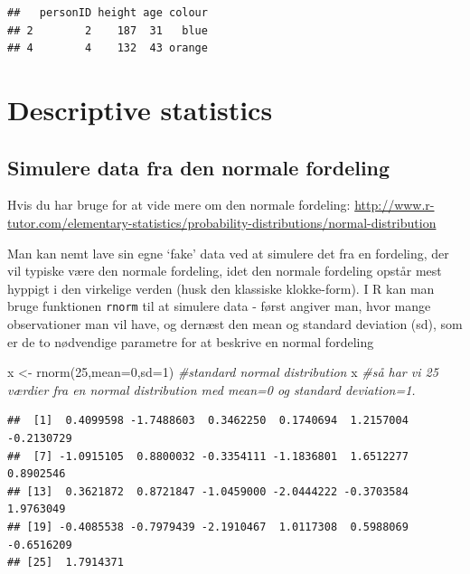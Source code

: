 \documentclass[
]{book}
\newenvironment{Shaded}{\begin{snugshade}}{\end{snugshade}}
\newcommand{\AttributeTok}[1]{\textcolor[rgb]{0.77,0.63,0.00}{#1}}
\newcommand{\CommentTok}[1]{\textcolor[rgb]{0.56,0.35,0.01}{\textit{#1}}}
\newcommand{\DecValTok}[1]{\textcolor[rgb]{0.00,0.00,0.81}{#1}}
\newcommand{\FunctionTok}[1]{\textcolor[rgb]{0.00,0.00,0.00}{#1}}
\newcommand{\NormalTok}[1]{#1}
\newcommand{\OtherTok}[1]{\textcolor[rgb]{0.56,0.35,0.01}{#1}}
\begin{document}
\begin{verbatim}
##   personID height age colour
## 2        2    187  31   blue
## 4        4    132  43 orange
\end{verbatim}

\hypertarget{descriptive-statistics}{%
\section{Descriptive statistics}\label{descriptive-statistics}}

\hypertarget{simulere-data-fra-den-normale-fordeling}{%
\subsection{Simulere data fra den normale fordeling}\label{simulere-data-fra-den-normale-fordeling}}

Hvis du har bruge for at vide mere om den normale fordeling: \url{http://www.r-tutor.com/elementary-statistics/probability-distributions/normal-distribution}

Man kan nemt lave sin egne `fake' data ved at simulere det fra en fordeling, der vil typiske være den normale fordeling, idet den normale fordeling opstår mest hyppigt i den virkelige verden (husk den klassiske klokke-form). I R kan man bruge funktionen \texttt{rnorm} til at simulere data - først angiver man, hvor mange observationer man vil have, og dernæst den mean og standard deviation (sd), som er de to nødvendige parametre for at beskrive en normal fordeling

\begin{Shaded}
\begin{Highlighting}[]
\NormalTok{x }\OtherTok{\textless{}{-}} \FunctionTok{rnorm}\NormalTok{(}\DecValTok{25}\NormalTok{,}\AttributeTok{mean=}\DecValTok{0}\NormalTok{,}\AttributeTok{sd=}\DecValTok{1}\NormalTok{) }\CommentTok{\#standard normal distribution}
\NormalTok{x }\CommentTok{\#så har vi 25 værdier fra en normal distribution med mean=0 og standard deviation=1.}
\end{Highlighting}
\end{Shaded}

\begin{verbatim}
##  [1]  0.4099598 -1.7488603  0.3462250  0.1740694  1.2157004 -0.2130729
##  [7] -1.0915105  0.8800032 -0.3354111 -1.1836801  1.6512277  0.8902546
## [13]  0.3621872  0.8721847 -1.0459000 -2.0444222 -0.3703584  1.9763049
## [19] -0.4085538 -0.7979439 -2.1910467  1.0117308  0.5988069 -0.6516209
## [25]  1.7914371
\end{verbatim}
\end{document}
